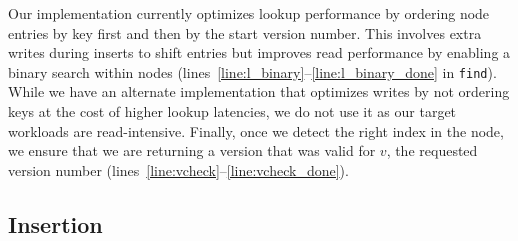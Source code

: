 Our implementation currently optimizes lookup performance by ordering
node entries by key first and then by the start version number.
This involves extra writes during inserts to shift entries but
improves read performance by enabling a binary search within nodes
(lines~\ref{line:l_binary}--\ref{line:l_binary_done} in
\texttt{find}).  While we have an alternate implementation that
optimizes writes by not ordering keys at the cost of higher lookup
latencies, we do not use it as our target workloads are
read-intensive.  Finally, once we detect the right index in the node,
we ensure that we are returning a version that was valid for $v$, the
requested version number
(lines~\ref{line:vcheck}--\ref{line:vcheck_done}).




\begin{comment}

\begin{figure*}[tbh]
\begin{tikzpicture}
[level 1/.style={sibling distance=3.3cm}]
[node distance=2cm on grid, >=stealth', auto]
 \node[nd={l,d,l}] {
    \btnode{text}{20}{4}{-}
    \btnode{second}{99}{1}{4}
    \btnode{third}{99}{4}{-}
 }
 child {node[nd={l,l,l}] (b2) {
    \btnode{text}{5}{4}{-}
    \btnode{second}{10}{5}{-}
    \btnode{third}{20}{4}{-}
   } 
 }
 child {node[nd={d,d,d}] (b1) {
    \btnode{text}{5}{2}{4}
    \btnode{second}{20}{3}{4}
    \btnode{third}{99}{1}{4}
   }
 }
 child {node[nd={l,l,l}] (b3) {
    \btnode{text}{40}{4}{-}
    \btnode{second}{99}{4}{-}
   }
 };
\end{tikzpicture}
\caption{Example of a consistent, durable B-Tree, for lookup}
\label{fig:l-cd-btree}
\end{figure*}

\end{comment}



\subsection{Insertion}
\label{sec:btree_insert}

